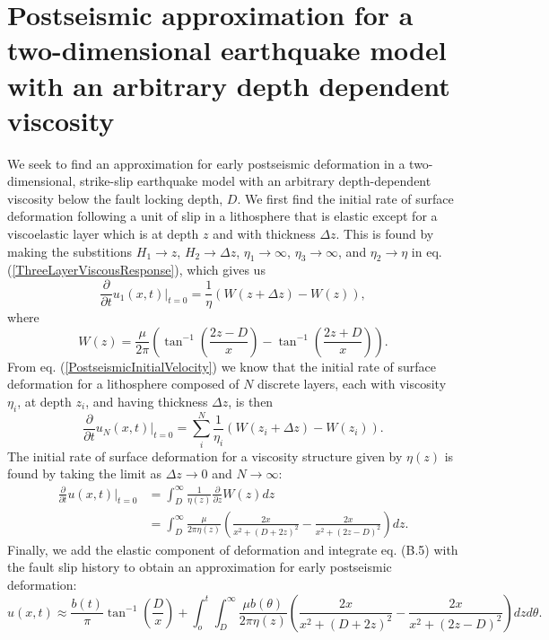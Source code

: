 \documentclass[extra]{gji}
\begin{document}
\section{Postseismic approximation for a two-dimensional earthquake model with an arbitrary depth dependent viscosity}
We seek to find an approximation for early postseismic deformation in
a two-dimensional, strike-slip earthquake model with an arbitrary
depth-dependent viscosity below the fault locking depth, $D$.  We
first find the initial rate of surface deformation following a unit of
slip in a lithosphere that is elastic except for a viscoelastic layer
which is at depth $z$ and with thickness $\Delta z$. This is found by
making the substitions $H_1 \to z$, $H_2 \to \Delta z$, $\eta_1 \to
\infty$, $\eta_3 \to \infty$, and $\eta_2 \to \eta$ in
eq. (\ref{ThreeLayerViscousResponse}), which gives us
\begin{equation}
  \frac{\partial}{\partial t}u_1(x,t)\big|_{t=0} = 
  \frac{1}{\eta}(W(z+\Delta z) - W(z)),
\end{equation}
where
\begin{equation}
  W(z) = \frac{\mu}{2\pi}\left(\tan^{-1}\left(\frac{2z-D}{x}\right) -
  \tan^{-1}\left(\frac{2z+D}{x}\right)\right).
\end{equation}
From eq. (\ref{PostseismicInitialVelocity}) we know that the initial
rate of surface deformation for a lithosphere composed of $N$ discrete
layers, each with viscosity $\eta_i$, at depth $z_i$, and having
thickness $\Delta z$, is then
\begin{equation}
  \frac{\partial}{\partial t}u_N(x,t)\big|_{t=0} = \sum_i^N
  \frac{1}{\eta_i}(W(z_i + \Delta z) - W(z_i)).
\end{equation}
The initial rate of surface deformation for a viscosity structure
given by $\eta(z)$ is found by taking the limit as $\Delta z \to 0$
and $N \to \infty$:
\begin{align}\label{ArbitraryViscousResponse}
 \frac{\partial}{\partial t}u(x,t)\big|_{t=0} &= \int_D^\infty
 \frac{1}{\eta(z)}\frac{\partial}{\partial z} W(z) dz\\
 &= \int_D^{\infty}\frac{\mu}{2\pi\eta(z)}\left(\frac{2x}{x^2 + \left(D + 2z\right)^2} -
                     \frac{2x}{x^2 + \left(2z - D\right)^2}\right) dz.
\end{align}
Finally, we add the elastic component of deformation and integrate
eq. (B.5) with the fault slip history to obtain
an approximation for early postseismic deformation:
\begin{equation}
u(x,t) \approx \frac{b(t)}{\pi}\tan^{-1}(\frac{D}{x}) + 
               \int_o^t\int_D^\infty \frac{\mu b(\theta)}{2\pi\eta(z)}
                                    \left(\frac{2x}{x^2 + \left(D + 2z\right)^2} - 
                                    \frac{2x}{x^2 + \left(2z - D\right)^2}\right)
                                    dz d\theta.
\end{equation}
\end{document}
